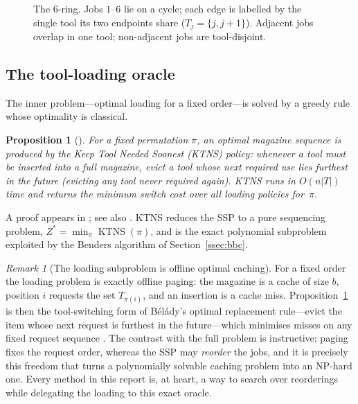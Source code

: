 \documentclass[11pt,a4paper]{article}
\theoremstyle{plain}
\newtheorem{proposition}{Proposition}
\theoremstyle{definition}
\theoremstyle{remark}
\newtheorem{remark}{Remark}
\DeclareMathOperator{\KTNS}{KTNS}
\newcommand{\Zst}{Z^{\ast}}
\begin{document}
\begin{figure}[h]\centering
{}
\caption{The $6$-ring. Jobs $1$--$6$ lie on a cycle; each edge is labelled by the
single tool its two endpoints share ($T_j=\{j,j+1\}$). Adjacent jobs overlap in one
tool; non-adjacent jobs are tool-disjoint.}\label{fig:ring}
\end{figure}

\subsection{The tool-loading oracle}\label{ssec:ktns}
The inner problem---optimal loading for a fixed order---is solved by a greedy rule
whose optimality is classical.
\begin{proposition}[\citealp{Tang1988}]\label{prop:ktns}
For a fixed permutation $\pi$, an optimal magazine sequence is produced by the
\emph{Keep Tool Needed Soonest} (KTNS) policy: whenever a tool must be inserted into
a full magazine, evict a tool whose next required use lies furthest in the future
(evicting any tool never required again). KTNS runs in $O(n\lvert T\rvert)$ time and
returns the minimum switch cost over all loading policies for~$\pi$.
\end{proposition}
A proof appears in \citet{Tang1988}; see also \citet{Crama1994}. KTNS reduces the
SSP to a pure sequencing problem, $\Zst=\min_{\pi}\KTNS(\pi)$, and is the exact
polynomial subproblem exploited by the Benders algorithm of
Section~\ref{ssec:bbc}.

\begin{remark}[The loading subproblem is offline optimal caching]\label{rem:belady}
For a fixed order the loading problem is exactly offline paging: the magazine is a
cache of size $b$, position $i$ requests the set $T_{\pi(i)}$, and an insertion is a
cache miss. Proposition~\ref{prop:ktns} is then the tool-switching form of
B\'el\'ady's optimal replacement rule---evict the item whose next request is
furthest in the future---which minimises misses on any fixed request sequence
\citep{Belady1966}. The contrast with the full problem is instructive: paging fixes
the request order, whereas the SSP may \emph{reorder} the jobs, and it is precisely
this freedom that turns a polynomially solvable caching problem into an NP-hard one.
Every method in this report is, at heart, a way to search over reorderings while
delegating the loading to this exact oracle.
\end{remark}
\end{document}
